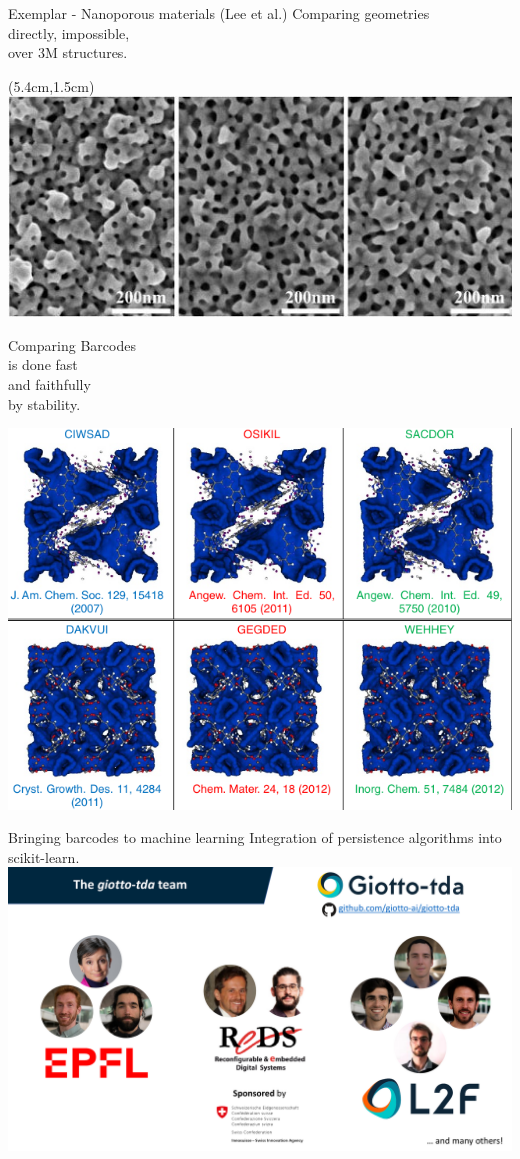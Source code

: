 \begin{frame}{Exemplar - Nanoporous materials (Lee et al.)}
	\pause
	\textcolor{pblue}{Comparing geometries} \\
	directly, impossible, \\
	over 3M structures.

	\begin{textblock*}{4cm}(5.4cm,1.5cm)
		\includegraphics[scale=.28]{aux/real_material}
	\end{textblock*}

	\pause\vspace*{2cm}
	\textcolor{pblue}{Comparing Barcodes} \\
	is done fast \\
	and faithfully \\
	by stability.

	\vspace*{-2.3cm}\hspace*{3.8cm}
	\includegraphics[scale=.6]{aux/nanoporous}
\end{frame}

\begin{frame}{Bringing barcodes to machine learning}
	\pause
	Integration of persistence algorithms into scikit-learn.
	\vskip 10pt
	\includegraphics[scale=.31]{aux/giotto}
\end{frame}
